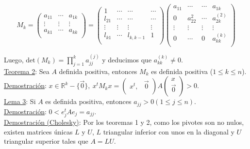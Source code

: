 $$M_{k} =
	\begin{pmatrix}
        a_{11} & \cdots & a_{1k}\\
        \vdots & \vdots & \vdots\\
        a_{k1} & \cdots & a_{kk}\\
	\end{pmatrix}
	=
	\begin{pmatrix}
        1 & \cdots & \cdots & \cdots\\
        l_{21} & \cdots & \cdots & \cdots\\
        \vdots & \vdots & \vdots & \vdots\\
        l_{k1} & \cdots & l_{k, k - 1} & 1\\
	\end{pmatrix}
	\begin{pmatrix}
        a_{11} & \cdots & \cdots & a_{1k}\\
        0 & a_{22}^{2} & \cdots & a_{2k}^{(2)}\\
        \vdots & \vdots & \vdots & \vdots\\
        0 & \cdots & 0 & a_{kk}^{(k)}\\
	\end{pmatrix}
$$

Luego, $\text{det}(M_{k}) = \prod \limits_{j = 1}^{k} a_{jj}^{(j)}$ y deducimos que $a_{kk}^{(k)} \neq 0$.\\

\underline{Teorema 2}: Sea $A$ definida positiva, entonces $M_{k}$ es definida positiva ($1 \leq k \leq n$).\\

\underline{Demostraci\'on}: $x \in \mathbb{R}^{k} - \{\Vec{0}\},\ x^{t}M_{k}x = \begin{pmatrix}
        x^{t}, & \Vec{0}\\
       	\end{pmatrix}A\begin{pmatrix}
        x\\
        \Vec{0}\\
       	\end{pmatrix} > 0$.\\

\underline{Lema 3}: Si $A$ es definida positiva, entonces $a_{jj} > 0 (1 \leq j \leq n)$.\\

\underline{Demostraci\'on}: $0 < e_{j}^{t}Ae_{j} = a_{jj}$.\\

\underline{Demostraci\'on (Cholesky)}: Por los teoremas 1 y 2, como los pivotes son no nulos, existen matrices \'unicas $L$ y $U$, $L$ triangular inferior con unos en la diagonal y $U$ triangular superior tales que $A = LU$.\\

